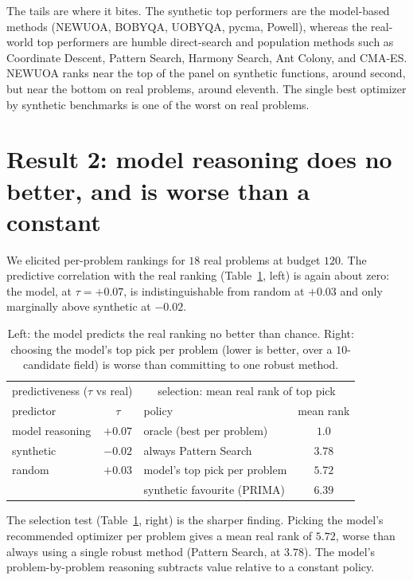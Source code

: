 \documentclass[11pt]{article}
\begin{document}
The tails are where it bites. The synthetic top performers are the model-based methods
(NEWUOA, BOBYQA, UOBYQA, pycma, Powell), whereas the real-world top performers are
humble direct-search and population methods such as Coordinate Descent, Pattern Search,
Harmony Search, Ant Colony, and CMA-ES. NEWUOA ranks near the top of the panel on
synthetic functions, around second, but near the bottom on real problems, around
eleventh. The single best optimizer by synthetic benchmarks is one of the worst on real
problems.

\section{Result 2: model reasoning does no better, and is worse than a constant}

We elicited per-problem rankings for $18$ real problems at budget $120$. The predictive
correlation with the real ranking (Table~\ref{tab:llm}, left) is again about zero: the
model, at $\tau=+0.07$, is indistinguishable from random at $+0.03$ and only marginally
above synthetic at $-0.02$.

\begin{table}[h]
\centering
\begin{tabular}{lc@{\qquad}lc}
\toprule
\multicolumn{2}{c}{predictiveness ($\tau$ vs real)} & \multicolumn{2}{c}{selection: mean real rank of top pick} \\
predictor & $\tau$ & policy & mean rank \\
\midrule
model reasoning & $+0.07$ & oracle (best per problem) & $1.0$ \\
synthetic       & $-0.02$ & always Pattern Search & $3.78$ \\
random          & $+0.03$ & model's top pick per problem & $5.72$ \\
                &         & synthetic favourite (PRIMA) & $6.39$ \\
\bottomrule
\end{tabular}
\caption{Left: the model predicts the real ranking no better than chance. Right:
choosing the model's top pick per problem (lower is better, over a $10$-candidate field)
is worse than committing to one robust method.}
\label{tab:llm}
\end{table}

The selection test (Table~\ref{tab:llm}, right) is the sharper finding. Picking the
model's recommended optimizer per problem gives a mean real rank of $5.72$, worse than
always using a single robust method (Pattern Search, at $3.78$). The model's
problem-by-problem reasoning subtracts value relative to a constant policy.
\end{document}
